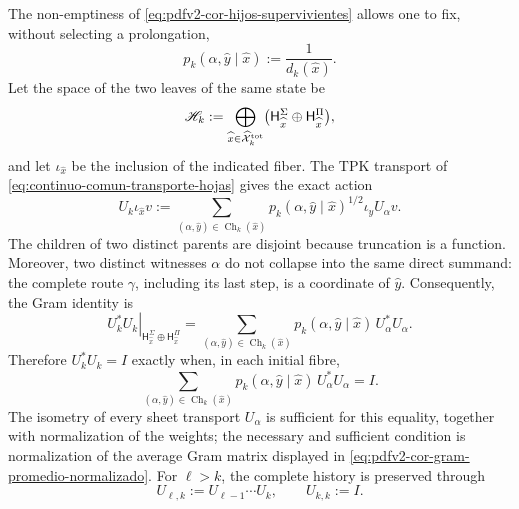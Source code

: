 The non-emptiness of \eqref{eq:pdfv2-cor-hijos-supervivientes} allows one to fix,
without selecting a prolongation,
\begin{equation}
\label{eq:pdfv2-cor-peso-conteo}
 p_k(\alpha,\widehat y\mid\widehat x)
 :=\frac1{d_k(\widehat x)}.
\end{equation}
Let the space of the two leaves of the same state be
\begin{equation}
\label{eq:pdfv2-cor-hilbert-hojas}
 \mathscr H_k:=
 \bigoplus_{\widehat x\in\widehat{\mathcal X}^{\rm tot}_k}
 \bigl(\mathsf H_{\widehat x}^{\Sigma}
       \oplus\mathsf H_{\widehat x}^{\Pi}\bigr),
\end{equation}
and let \(\iota_{\widehat x}\) be the inclusion of the indicated fiber. The TPK
transport of \eqref{eq:continuo-comun-transporte-hojas} gives the exact action
\begin{equation}
\label{eq:pdfv2-cor-u-comun}
 U_k\iota_{\widehat x}v:=
 \sum_{(\alpha,\widehat y)\in\operatorname{Ch}_k(\widehat x)}
 p_k(\alpha,\widehat y\mid\widehat x)^{1/2}
 \iota_{\widehat y}U_\alpha v.
\end{equation}
The children of two distinct parents are disjoint because truncation is a
function. Moreover, two distinct witnesses \(\alpha\) do not collapse into the same
direct summand: the complete route \(\gamma\), including its last step, is a
coordinate of \(\widehat y\). Consequently, the Gram identity is
\begin{equation}
\label{eq:pdfv2-cor-u-gram}
 \left.U_k^*U_k\right|_{\mathsf H_{\widehat x}^{\Sigma}
       \oplus\mathsf H_{\widehat x}^{\Pi}}
 =
 \sum_{(\alpha,\widehat y)\in\operatorname{Ch}_k(\widehat x)}
 p_k(\alpha,\widehat y\mid\widehat x)\,U_\alpha^*U_\alpha.
\end{equation}
Therefore \(U_k^*U_k=I\) exactly when, in each initial fibre,
\begin{equation}
\label{eq:pdfv2-cor-gram-promedio-normalizado}
 \sum_{(\alpha,\widehat y)\in\operatorname{Ch}_k(\widehat x)}
 p_k(\alpha,\widehat y\mid\widehat x)\,U_\alpha^*U_\alpha=I.
\end{equation}
The isometry of every sheet transport \(U_\alpha\) is sufficient for this equality, together with normalization of the weights; the necessary and sufficient condition is normalization of the average Gram matrix displayed in \eqref{eq:pdfv2-cor-gram-promedio-normalizado}. For \(\ell>k\), the complete history is preserved through
\begin{equation}
\label{eq:pdfv2-cor-u-iterado}
 U_{\ell,k}:=U_{\ell-1}\cdots U_k,
 \qquad U_{k,k}:=I.
\end{equation}

